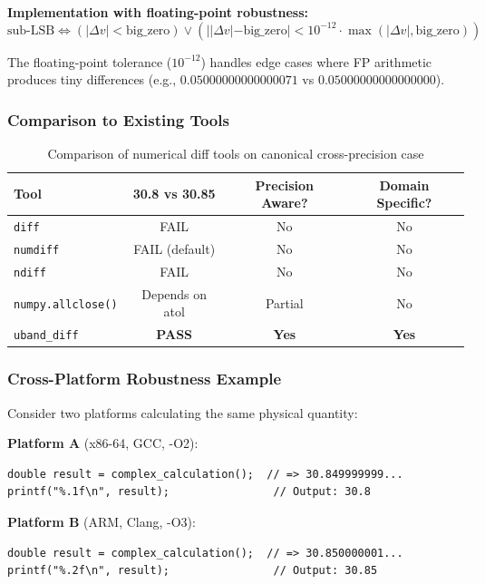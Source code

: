 \documentclass[11pt,letterpaper]{article}
\newcommand{\ubdiff}{\texttt{uband\_diff}}
\begin{document}
\noindent\textbf{Implementation with floating-point robustness:}
\begin{equation}
    \text{sub-LSB} \iff \left(|\Delta v| < \text{big\_zero}\right) \vee \left(||\Delta v| - \text{big\_zero}| < 10^{-12} \cdot \max(|\Delta v|, \text{big\_zero})\right)
\end{equation}

The floating-point tolerance ($10^{-12}$) handles edge cases where FP arithmetic produces tiny differences (e.g., $0.05000000000000071$ vs $0.05000000000000000$).

\subsubsection{Comparison to Existing Tools}

\begin{table}[h]
\centering
\begin{tabular}{lccc}
\toprule
\textbf{Tool} & \textbf{30.8 vs 30.85} & \textbf{Precision Aware?} & \textbf{Domain Specific?} \\
\midrule
\texttt{diff} & FAIL & No & No \\
\texttt{numdiff} & FAIL (default) & No & No \\
\texttt{ndiff} & FAIL & No & No \\
\texttt{numpy.allclose()} & Depends on atol & Partial & No \\
\ubdiff{} & \textbf{PASS} & \textbf{Yes} & \textbf{Yes} \\
\bottomrule
\end{tabular}
\caption{Comparison of numerical diff tools on canonical cross-precision case}
\label{tab:tool-comparison}
\end{table}

\subsubsection{Cross-Platform Robustness Example}

Consider two platforms calculating the same physical quantity:

\textbf{Platform A} (x86-64, GCC, -O2):
\begin{verbatim}
double result = complex_calculation();  // => 30.849999999...
printf("%.1f\n", result);                // Output: 30.8
\end{verbatim}

\textbf{Platform B} (ARM, Clang, -O3):
\begin{verbatim}
double result = complex_calculation();  // => 30.850000001...
printf("%.2f\n", result);                // Output: 30.85
\end{verbatim}
\end{document}
